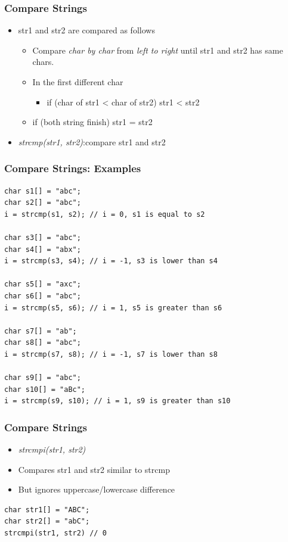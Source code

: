 \documentclass{../c-lecture}
\begin{document}
\begin{frame}
  \frametitle{Compare Strings}
  \begin{itemize}
    \item str1 and str2 are compared as follows
    \begin{itemize}
      \item
        Compare \textit{\color{LimeGreen} char by char} from
        \textit{\color{Cyan} left to right} until str1 and str2 has same
        chars.

      \item In the first different char
      \begin{itemize}
        \item if (char of str1 < char of str2) \textrightarrow str1 < str2
      \end{itemize}
      \item if (both string finish) \textrightarrow str1 = str2
    \end{itemize}
    \item
      \textit{\color{YellowOrange} strcmp(str1, str2)}:compare str1 and str2
  \end{itemize}
\end{frame}

\begin{frame}[fragile]
  \frametitle{Compare Strings: Examples}
  \begin{verbatim}
char s1[] = "abc";
char s2[] = "abc";
i = strcmp(s1, s2); // i = 0, s1 is equal to s2

char s3[] = "abc";
char s4[] = "abx";
i = strcmp(s3, s4); // i = -1, s3 is lower than s4

char s5[] = "axc";
char s6[] = "abc";
i = strcmp(s5, s6); // i = 1, s5 is greater than s6

char s7[] = "ab";
char s8[] = "abc";
i = strcmp(s7, s8); // i = -1, s7 is lower than s8

char s9[] = "abc";
char s10[] = "aBc";
i = strcmp(s9, s10); // i = 1, s9 is greater than s10
  \end{verbatim}
\end{frame}

\begin{frame}[fragile]
  \frametitle{Compare Strings}
  \begin{itemize}
    \item \textit{\color{YellowOrange} strcmpi(str1, str2)}
    \item Compares str1 and str2 similar to strcmp
    \item But ignores uppercase/lowercase difference
  \end{itemize}
  \begin{verbatim}
char str1[] = "ABC";
char str2[] = "abC";
strcmpi(str1, str2) // 0
  \end{verbatim}
\end{frame}
\end{document}
